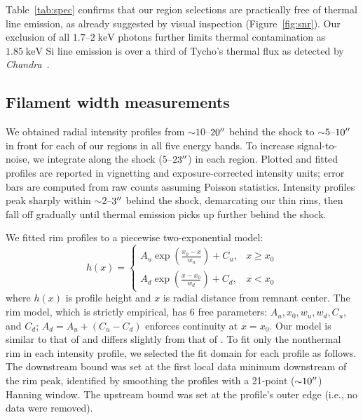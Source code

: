 \documentclass[iop, apj, numberedappendix]{emulateapj}
\newcommand*{\mt}{\mathrm}
\newcommand*{\unit}[1]{\;\mt{#1}}  %
\newcommand*{\abt}{\mathord{\sim}} %
\newcommand*{\Chandra}{\textit{Chandra}\ }
\begin{document}
Table~\ref{tab:spec} confirms that our region selections are practically free
of thermal line emission, as already suggested by visual inspection
(Figure~\ref{fig:snr}).  Our exclusion of all $1.7$--$2 \unit{keV}$ photons
further limits thermal contamination as $1.85 \unit{keV}$ Si line emission is
over a third of Tycho's thermal flux as detected by \Chandra \citep{hwang2002}.

\subsection{Filament width measurements}
\label{sec:fwhms}

We obtained radial intensity profiles from $\abt 10$--$20\mbox{$^{\prime\prime}$}$ behind the
shock to $\abt 5$--$10\mbox{$^{\prime\prime}$}$ in front for each of our regions in all five
energy bands.  To increase signal-to-noise, we integrate along the shock
($5$--$23\mbox{$^{\prime\prime}$}$) in each region.  Plotted and fitted profiles are reported in
vignetting and exposure-corrected intensity units; error bars are computed from
raw counts assuming Poisson statistics.  Intensity profiles peak sharply
within $\abt 2$--$3\mbox{$^{\prime\prime}$}$ behind the shock, demarcating our thin rims,
then fall off gradually until thermal emission picks up further behind the
shock.

We fitted rim profiles to a piecewise two-exponential model:
\begin{equation} \label{eq:prof}
    h(x) =
    \begin{cases}
        A_u \exp \left(\frac{x_0 - x}{w_u}\right) + C_u, &x \geq x_0 \\
        A_d \exp \left(\frac{x - x_0}{w_d}\right) + C_d, &x < x_0
    \end{cases}
\end{equation}
where $h(x)$ is profile height and $x$ is radial distance from remnant center.
The rim model, which is strictly empirical, has 6 free parameters:
$A_u, x_0, w_u, w_d, C_u$, and $C_d$; $A_d = A_u + (C_u - C_d)$ enforces
continuity at $x=x_0$. Our model is similar to that of \citet{bamba2003,
bamba2005-hist} and differs slightly from that of .
To fit only the nonthermal rim in each intensity profile, we selected the fit
domain for each profile as follows.  The downstream bound was set at the first
local data minimum downstream of the rim peak, identified by smoothing the
profiles with a 21-point ($\abt 10\arcsec$) Hanning window.  The upstream bound
was set at the profile's outer edge (i.e., no data were removed).
\end{document}
